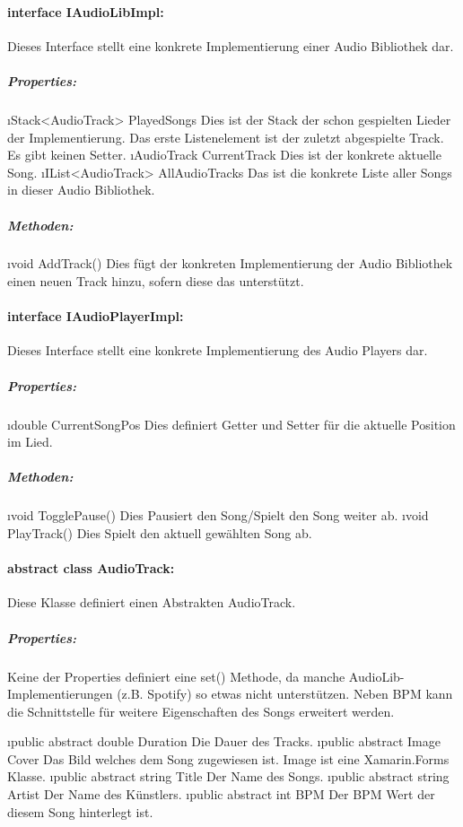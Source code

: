 \documentclass[../entwurf.tex]{subfiles}
\begin{document}
			\paragraph{interface IAudioLibImpl:}
				Dieses Interface stellt eine konkrete Implementierung einer Audio Bibliothek dar.
				\subparagraph{Properties:}
					\begin{itemize}
						\i{Stack<AudioTrack> PlayedSongs} Dies ist der Stack der schon gespielten Lieder der Implementierung.
						Das erste Listenelement ist der zuletzt abgespielte Track. Es gibt keinen Setter. 
						\i{AudioTrack CurrentTrack} Dies ist der konkrete aktuelle Song.
						\i{IList<AudioTrack> AllAudioTracks} Das ist die konkrete Liste aller Songs in dieser Audio Bibliothek.
					\end{itemize}
				\subparagraph{Methoden:}
					\begin{itemize}
						\i{void AddTrack()} Dies fügt der konkreten Implementierung der Audio Bibliothek einen neuen Track hinzu, sofern
						diese das unterstützt.
					\end{itemize}
			\paragraph{interface IAudioPlayerImpl:}
				Dieses Interface stellt eine konkrete Implementierung des Audio Players dar.
				\subparagraph{Properties:}
					\begin{itemize}
						\i{double CurrentSongPos} Dies definiert Getter und Setter für die aktuelle Position im Lied.
					\end{itemize}
				\subparagraph{Methoden:}
					\begin{itemize}
						\i{void TogglePause()} Dies Pausiert den Song/Spielt den Song weiter ab.
						\i{void PlayTrack()} Dies Spielt den aktuell gewählten Song ab.
					\end{itemize}
			\paragraph{abstract class AudioTrack:}
				Diese Klasse definiert einen Abstrakten AudioTrack.
				\subparagraph{Properties:}
					Keine der Properties definiert eine set() Methode, da manche AudioLib-Implementierungen (z.B. Spotify) so etwas nicht 
					unterstützen. Neben BPM kann die Schnittstelle für weitere Eigenschaften des Songs erweitert werden.
					\begin{itemize}
						\i{public abstract double Duration} Die Dauer des Tracks.
						\i{public abstract Image Cover} Das Bild welches dem Song zugewiesen ist. Image ist eine Xamarin.Forms Klasse.
						\i{public abstract string Title} Der Name des Songs.
						\i{public abstract string Artist} Der Name des Künstlers.
						\i{public abstract int BPM} Der BPM Wert der diesem Song hinterlegt ist.
					\end{itemize}
\end{document}
